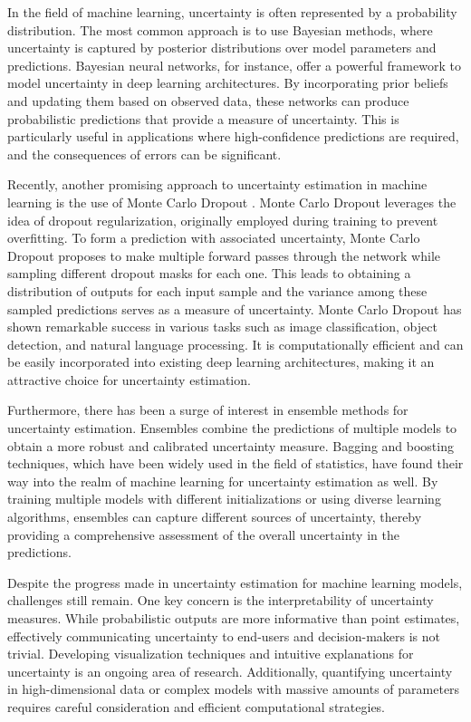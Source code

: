 In the field of machine learning, uncertainty is often represented by a probability distribution. The most common approach is to use Bayesian methods, where uncertainty is captured by posterior distributions over model parameters and predictions. Bayesian neural networks, for instance, offer a powerful framework to model uncertainty in deep learning architectures. By incorporating prior beliefs and updating them based on observed data, these networks can produce probabilistic predictions that provide a measure of uncertainty. This is particularly useful in applications where high-confidence predictions are required, and the consequences of errors can be significant.

Recently, another promising approach to uncertainty estimation in machine learning is the use of Monte Carlo Dropout \cite{gal_dropout_2016}. Monte Carlo Dropout leverages the idea of dropout regularization, originally employed during training to prevent overfitting. To form a prediction with associated uncertainty, Monte Carlo Dropout proposes to make multiple forward passes through the network while sampling different dropout masks for each one. This leads to obtaining a distribution of outputs for each input sample and the variance among these sampled predictions serves as a measure of uncertainty. Monte Carlo Dropout has shown remarkable success in various tasks such as image classification, object detection, and natural language processing. It is computationally efficient and can be easily incorporated into existing deep learning architectures, making it an attractive choice for uncertainty estimation.

Furthermore, there has been a surge of interest in ensemble methods for uncertainty estimation. Ensembles combine the predictions of multiple models to obtain a more robust and calibrated uncertainty measure. Bagging and boosting techniques, which have been widely used in the field of statistics, have found their way into the realm of machine learning for uncertainty estimation as well. By training multiple models with different initializations or using diverse learning algorithms, ensembles can capture different sources of uncertainty, thereby providing a comprehensive assessment of the overall uncertainty in the predictions.

Despite the progress made in uncertainty estimation for machine learning models, challenges still remain. One key concern is the interpretability of uncertainty measures. While probabilistic outputs are more informative than point estimates, effectively communicating uncertainty to end-users and decision-makers is not trivial. Developing visualization techniques and intuitive explanations for uncertainty is an ongoing area of research. Additionally, quantifying uncertainty in high-dimensional data or complex models with massive amounts of parameters requires careful consideration and efficient computational strategies.


